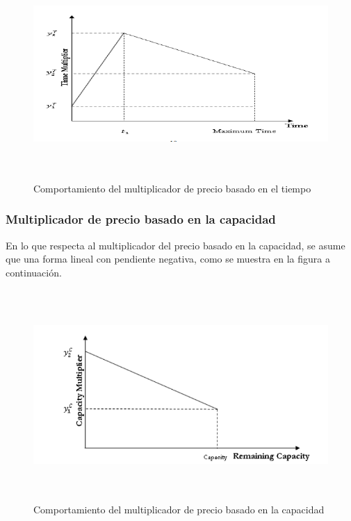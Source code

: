 {{\begin{figure}[H]
  \centering
      \includegraphics[width=\maxwidth,height=8cm]{figures/Time_Mult.png} 
  \caption{Comportamiento del multiplicador de precio basado en el tiempo}
\end{figure}

\subsubsection*{Multiplicador de precio basado en la capacidad}

En lo que respecta al multiplicador del precio basado en la capacidad, se asume que una forma lineal con pendiente negativa, como se muestra en la figura a continuación.

\begin{figure}[H]
  \centering
      \includegraphics[width=\maxwidth,height=8cm]{figures/Cap_Mult.png} 
  \caption{Comportamiento del multiplicador de precio basado en la capacidad}
\end{figure}

}}
